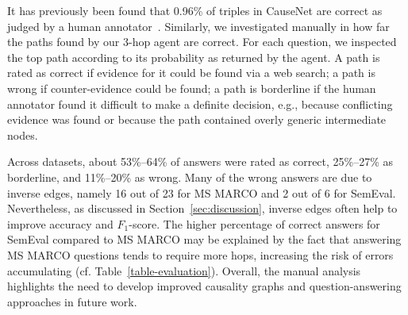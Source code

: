 

It has previously been found that 0.96\% of triples in CauseNet are correct as judged by a human annotator~\cite{Heindorf2020Causenet}. Similarly, we investigated manually in how far the paths found by our 3-hop agent are correct. For each question, we inspected the top path according to its probability as returned by the agent. A path is rated as correct if evidence for it could be found via a web search; a path is wrong if counter-evidence could be found; a path is borderline if the human annotator found it difficult to make a definite decision, e.g., because conflicting evidence was found or because the path contained overly generic intermediate nodes.%

Across datasets, about 53\%--64\% of answers were rated as correct, 25\%--27\% as borderline, and 11\%--20\% as wrong. Many of the wrong answers are due to inverse edges, namely 16 out of 23 for MS MARCO and 2 out of 6 for SemEval. Nevertheless, as discussed in Section~\ref{sec:discussion}, inverse edges often help to improve accuracy and $F_1$-score. The higher percentage of correct answers for SemEval compared to MS MARCO may be explained by the fact that answering MS MARCO questions tends to require more hops, increasing the risk of errors accumulating (cf. Table~\ref{table-evaluation}). Overall, the manual analysis highlights the need to develop improved causality graphs and question-answering approaches in future work. 
